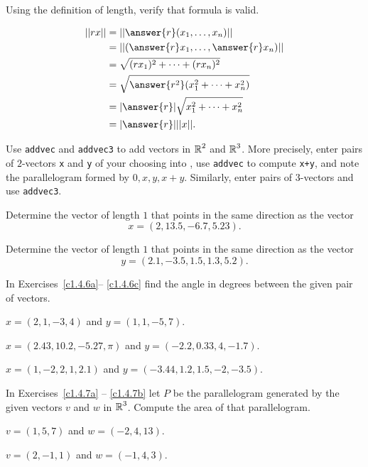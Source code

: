 \documentclass{ximera}
\begin{document}
\begin{exercise}  \label{c1.4.9A}
Using the definition of length, verify that formula  
is valid.
\begin{prompt}
\begin{align*}
||rx|| & = ||\answer{r}(x_1,\dots,x_n)|| \\
& = ||(\answer{r}x_1,\dots,\answer{r}x_n)|| \\
& = \sqrt{(rx_1)^2 + \cdots + (rx_n)^2} \\
& = \sqrt{ \answer{r^2} (x_1^2 + \cdots + x_n^2)} \\
& = |\answer{r}|\sqrt{x_1^2 + \cdots + x_n^2} \\
& = |\answer{r}| ||x||.
\end{align*}
\end{prompt}
\end{exercise}


\CEXER

\begin{exercise} \label{c1.4.4}
Use {\tt addvec} and {\tt addvec3} to add vectors in $\mbox{$\Bbb{R}$}^2$ and
$\mbox{$\Bbb{R}$}^3$.  More precisely, enter pairs of $2$-vectors {\tt x} and {\tt y} 
of your choosing into \Matlabp, use {\tt addvec} to compute {\tt x+y},
and note the parallelogram formed by $0,x,y,x+y$.  Similarly, enter 
pairs of $3$-vectors and use {\tt addvec3}.
\end{exercise}

\begin{exercise} \label{c1.4.5}
Determine the vector of length $1$ that points in the same direction
as the vector
\[
x=(2,13.5,-6.7,5.23).
\]
\end{exercise}

\begin{exercise} \label{c1.4.5b}
Determine the vector of length $1$ that points in the same direction
as the vector
\[
y=(2.1,-3.5,1.5,1.3,5.2).
\]
\end{exercise}

\noindent In Exercises~\ref{c1.4.6a}-- \ref{c1.4.6c} find the angle in
degrees between the given pair of vectors.
\begin{exercise} \label{c1.4.6a}
$x=(2,1,-3,4)$ and $y=(1,1,-5,7)$.
\end{exercise}
\begin{exercise} \label{c1.4.6b}
$x=(2.43, 10.2,-5.27,\pi)$ and $y= (-2.2,0.33,4,-1.7)$.
\end{exercise}
\begin{exercise} \label{c1.4.6c}
$x=(1,-2,2,1,2.1)$ and $y=(-3.44,1.2,1.5,-2,-3.5)$.
\end{exercise}

\noindent In Exercises~\ref{c1.4.7a} -- \ref{c1.4.7b} let $P$ be the 
parallelogram generated by the given vectors $v$ and $w$ in $\mbox{$\Bbb{R}$}^3$.  
Compute the area of that parallelogram.
\begin{exercise} \label{c1.4.7a}
$v=(1,5,7)$ and $w=(-2,4,13)$.
\end{exercise}
\begin{exercise} \label{c1.4.7b}
$v=(2,-1,1)$ and $w=(-1,4,3)$.
\end{exercise}
\end{document}
